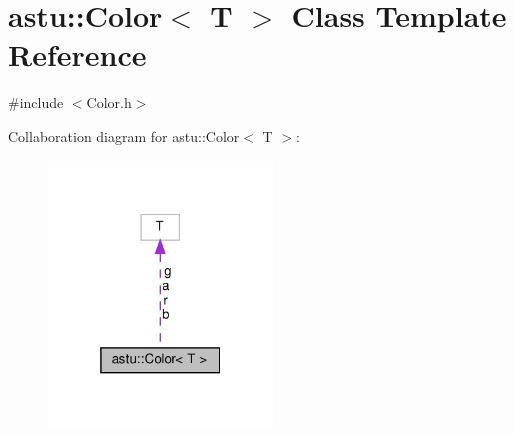 \hypertarget{classastu_1_1Color}{}\section{astu\+:\+:Color$<$ T $>$ Class Template Reference}
\label{classastu_1_1Color}


{\ttfamily \#include $<$Color.\+h$>$}



Collaboration diagram for astu\+:\+:Color$<$ T $>$\+:\nopagebreak
\begin{figure}[H]
\begin{center}
\leavevmode
\includegraphics[width=169pt]{classastu_1_1Color__coll__graph}
\end{center}
\end{figure}
